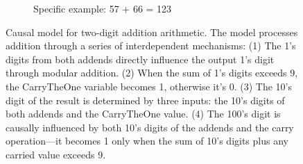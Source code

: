 \documentclass{article}
\theoremstyle{plain}
\theoremstyle{definition}
\theoremstyle{remark}
\begin{document}
\begin{figure}[H]
\begin{subfigure}{0.48\textwidth}
{
        }
        \caption{Specific example: 57 + 66 = 123}
        \label{fig:arith-specific}
    \end{subfigure}
    
    \caption{Causal model for two-digit addition arithmetic. The model processes addition through a series of interdependent mechanisms: (1) The 1's digits from both addends directly influence the output 1's digit through modular addition. (2) When the sum of 1's digits exceeds 9, the CarryTheOne variable becomes 1, otherwise it's 0. (3) The 10's digit of the result is determined by three inputs: the 10's digits of both addends and the CarryTheOne value. (4) The 100's digit is causally influenced by both 10's digits of the addends and the carry operation—it becomes 1 only when the sum of 10's digits plus any carried value exceeds 9.}
    \label{fig:arithmetic-full}
\end{figure}
\end{document}
